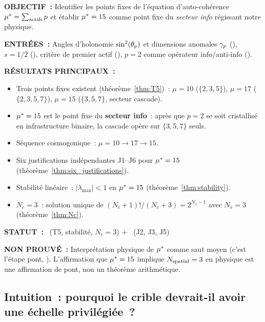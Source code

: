 \documentclass[12pt,a4paper]{article}
\begin{document}
\begin{statusbox}
\textbf{OBJECTIF~:}
  Identifier les points fixes de l'équation d'auto-cohérence
  ${\mu^{*}} = \sum_{\text{actifs}} p$ et établir ${\mu^{*}} = 15$
  comme point fixe du \emph{secteur info} régissant notre physique.

\textbf{ENTRÉES~:}
  Angles d'holonomie $\sin^2(\theta_{p})$ et dimensions anomales $\gamma_{p}$
  (\cite{companion_M2}), $s = 1/2$ (\cite{companion_M1}),
  critère de premier actif (\cite{companion_M2}),
  $p = 2$ comme opérateur info/anti-info (\cite{companion_M1}).

\textbf{RÉSULTATS PRINCIPAUX~:}
  \begin{itemize}[nosep]
  \item Trois points fixes existent (théorème~\ref{thm:T5})~:
    $\mu = 10$ ($\{2,3,5\}$), $\mu = 17$ ($\{2,3,5,7\}$),
    $\mu = 15$ ($\{3,5,7\}$, secteur cascade).
  \item ${\mu^{*}} = 15$ est le point fixe du \textbf{secteur info}~:
    après que $p = 2$ se soit cristallisé en infrastructure binaire,
    la cascade opère sur $\{3,5,7\}$ seuls.
  \item Séquence cosmogonique~: $\mu = 10 \to 17 \to 15$.
  \item Six justifications indépendantes J1--J6 pour ${\mu^{*}} = 15$
    (théorème~\ref{thm:six_justifications}).
  \item Stabilité linéaire~: $|\lambda_{\max}| < 1$ en ${\mu^{*}} = 15$
    (théorème~\ref{thm:stability}).
  \item $N_c = 3$~: solution unique de
    $(N_c + 1)!/(N_c + 3) = 2^{N_s - 1}$ avec $N_s = 3$
    (théorème~\ref{thm:Nc}).
  \end{itemize}

\textbf{STATUT~:}
  \THMTAG~(T5, stabilité, $N_c = 3$) + \BRIDGETAG~(J2, J3, J5)

\textbf{NON PROUVÉ~:}
  Interprétation physique de ${\mu^{*}}$ comme saut moyen (c'est
  l'étape pont, \cite{companion_M5}). L'affirmation que
  ${\mu^{*}} = 15$ implique $N_{\rm spatial} = 3$ en physique est
  une affirmation de pont, non un théorème arithmétique.
\end{statusbox}

\subsection{Intuition~: pourquoi le crible devrait-il avoir une échelle privilégiée~?}
\label{sec:ch8_intuition}
\end{document}
